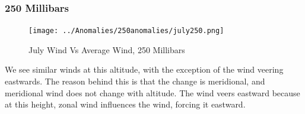 \documentclass[hidelinks]{article}
\begin{document}
\subsubsection{250 Millibars}
\begin{figure}[h!]
	\centering
	\texttt{[image: ../Anomalies/250anomalies/july250.png]}
	\caption{July Wind Vs Average Wind, 250 Millibars}
\end{figure}
\noindent We see similar winds at this altitude, with the exception of the wind veering eastwards. The reason behind this is that the change is meridional, and meridional wind does not change with altitude. The wind veers eastward because at this height, zonal wind influences the wind, forcing it eastward.
\newpage

{}

\end{document}
